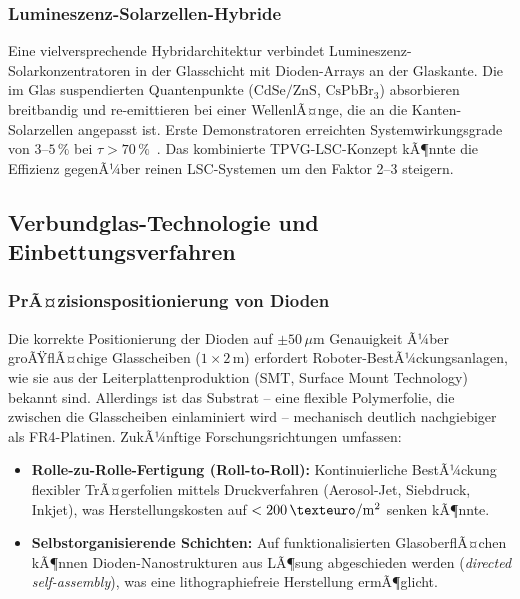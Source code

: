﻿\documentclass[a4paper,12pt]{article}
\theoremstyle{definition}
\theoremstyle{remark}
\begin{document}
\subsubsection{Lumineszenz-Solarzellen-Hybride}
Eine vielversprechende Hybridarchitektur verbindet Lumineszenz-Solarkonzentratoren in der Glasschicht mit Dioden-Arrays an der Glaskante. Die im Glas
suspendierten Quantenpunkte ($\mathrm{CdSe/ZnS}$, $\mathrm{CsPbBr_3}$)
absorbieren breitbandig und re-emittieren bei einer WellenlÃ¤nge, die an
die Kanten-Solarzellen angepasst ist. Erste Demonstratoren erreichten
Systemwirkungsgrade von $3$--$5\,\%$ bei $\tau > 70\,\%$~\cite{Brovelli2022}.
Das kombinierte TPVG-LSC-Konzept kÃ¶nnte die Effizienz gegenÃ¼ber reinen
LSC-Systemen um den Faktor 2--3 steigern.

\subsection{Verbundglas-Technologie und Einbettungsverfahren}

\subsubsection{PrÃ¤zisionspositionierung von Dioden}
Die korrekte Positionierung der Dioden auf $\pm 50\,\mu\mathrm{m}$
Genauigkeit Ã¼ber groÃŸflÃ¤chige Glasscheiben ($1 \times 2\,\mathrm{m}$)
erfordert Roboter-BestÃ¼ckungsanlagen, wie sie aus der Leiterplattenproduktion
(SMT, Surface Mount Technology) bekannt sind. Allerdings ist das
Substrat -- eine flexible Polymerfolie, die zwischen die Glasscheiben
einlaminiert wird -- mechanisch deutlich nachgiebiger als FR4-Platinen.
ZukÃ¼nftige Forschungsrichtungen umfassen:
\begin{itemize}
  \item \textbf{Rolle-zu-Rolle-Fertigung (Roll-to-Roll):} Kontinuierliche
    BestÃ¼ckung flexibler TrÃ¤gerfolien mittels Druckverfahren
    (Aerosol-Jet, Siebdruck, Inkjet), was Herstellungskosten auf
    $<200\,\mathrm{\texteuro/m^2}$ senken kÃ¶nnte.
  \item \textbf{Selbstorganisierende Schichten:} Auf funktionalisierten
    GlasoberflÃ¤chen kÃ¶nnen Dioden-Nanostrukturen aus LÃ¶sung abgeschieden
    werden (\emph{directed self-assembly}), was eine lithographiefreie
    Herstellung ermÃ¶glicht.
\end{itemize}
\end{document}
